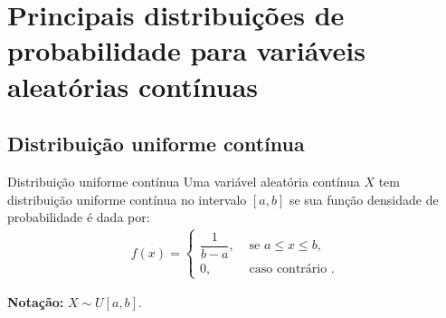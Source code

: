 \documentclass[9pt]{beamer}
\DeclareMathOperator{\espe}{E}
\DeclareMathOperator{\vari}{Var}
\begin{document}
\section{Principais distribuições de probabilidade para variáveis aleatórias contínuas}

\subsection{Distribuição uniforme contínua}

\begin{frame}{Distribuição uniforme contínua}
 Uma variável aleatória contínua $X$ tem distribuição uniforme contínua no intervalo $[a,b]$ se sua função densidade de probabilidade é dada por:
 \begin{align*}
  f(x) = \begin{cases}
          \dfrac{1}{b-a}, & \mbox{ se } a \leq x \leq b,\\
          0, & \mbox{ caso contrário }.
         \end{cases}
 \end{align*}
\begin{figure}[ht]
\centering
\caption{}
 \end{figure}
 \vfill
 
 \textbf{Notação:} $X \sim U[a, b]$.
 
\end{frame}
\end{document}
